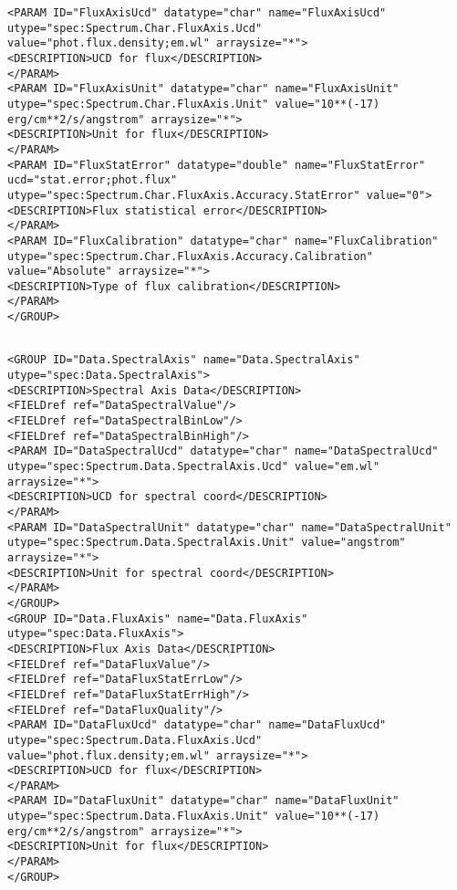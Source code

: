 \begin{landscape}
{\begin{flushleft}
\begin{fmlpage}
\begin{verbatim}
<PARAM ID="FluxAxisUcd" datatype="char" name="FluxAxisUcd" utype="spec:Spectrum.Char.FluxAxis.Ucd" value="phot.flux.density;em.wl" arraysize="*">
<DESCRIPTION>UCD for flux</DESCRIPTION>
</PARAM>
<PARAM ID="FluxAxisUnit" datatype="char" name="FluxAxisUnit" utype="spec:Spectrum.Char.FluxAxis.Unit" value="10**(-17) erg/cm**2/s/angstrom" arraysize="*">
<DESCRIPTION>Unit for flux</DESCRIPTION>
</PARAM>
<PARAM ID="FluxStatError" datatype="double" name="FluxStatError" ucd="stat.error;phot.flux" utype="spec:Spectrum.Char.FluxAxis.Accuracy.StatError" value="0">
<DESCRIPTION>Flux statistical error</DESCRIPTION>
</PARAM>
<PARAM ID="FluxCalibration" datatype="char" name="FluxCalibration" utype="spec:Spectrum.Char.FluxAxis.Accuracy.Calibration" value="Absolute" arraysize="*">
<DESCRIPTION>Type of flux calibration</DESCRIPTION>
</PARAM>
</GROUP>
\end{verbatim}
\end{fmlpage}

\begin{fmlpage}
\begin{verbatim}

<GROUP ID="Data.SpectralAxis" name="Data.SpectralAxis" utype="spec:Data.SpectralAxis">
<DESCRIPTION>Spectral Axis Data</DESCRIPTION>
<FIELDref ref="DataSpectralValue"/>
<FIELDref ref="DataSpectralBinLow"/>
<FIELDref ref="DataSpectralBinHigh"/>
<PARAM ID="DataSpectralUcd" datatype="char" name="DataSpectralUcd" utype="spec:Spectrum.Data.SpectralAxis.Ucd" value="em.wl" arraysize="*">
<DESCRIPTION>UCD for spectral coord</DESCRIPTION>
</PARAM>
<PARAM ID="DataSpectralUnit" datatype="char" name="DataSpectralUnit" utype="spec:Spectrum.Data.SpectralAxis.Unit" value="angstrom" arraysize="*">
<DESCRIPTION>Unit for spectral coord</DESCRIPTION>
</PARAM>
</GROUP>
<GROUP ID="Data.FluxAxis" name="Data.FluxAxis" utype="spec:Data.FluxAxis">
<DESCRIPTION>Flux Axis Data</DESCRIPTION>
<FIELDref ref="DataFluxValue"/>
<FIELDref ref="DataFluxStatErrLow"/>
<FIELDref ref="DataFluxStatErrHigh"/>
<FIELDref ref="DataFluxQuality"/>
<PARAM ID="DataFluxUcd" datatype="char" name="DataFluxUcd" utype="spec:Spectrum.Data.FluxAxis.Ucd" value="phot.flux.density;em.wl" arraysize="*">
<DESCRIPTION>UCD for flux</DESCRIPTION>
</PARAM>
<PARAM ID="DataFluxUnit" datatype="char" name="DataFluxUnit" utype="spec:Spectrum.Data.FluxAxis.Unit" value="10**(-17) erg/cm**2/s/angstrom" arraysize="*">
<DESCRIPTION>Unit for flux</DESCRIPTION>
</PARAM>
</GROUP>



\end{verbatim}
\end{fmlpage}
\end{flushleft}}
\end{landscape}
